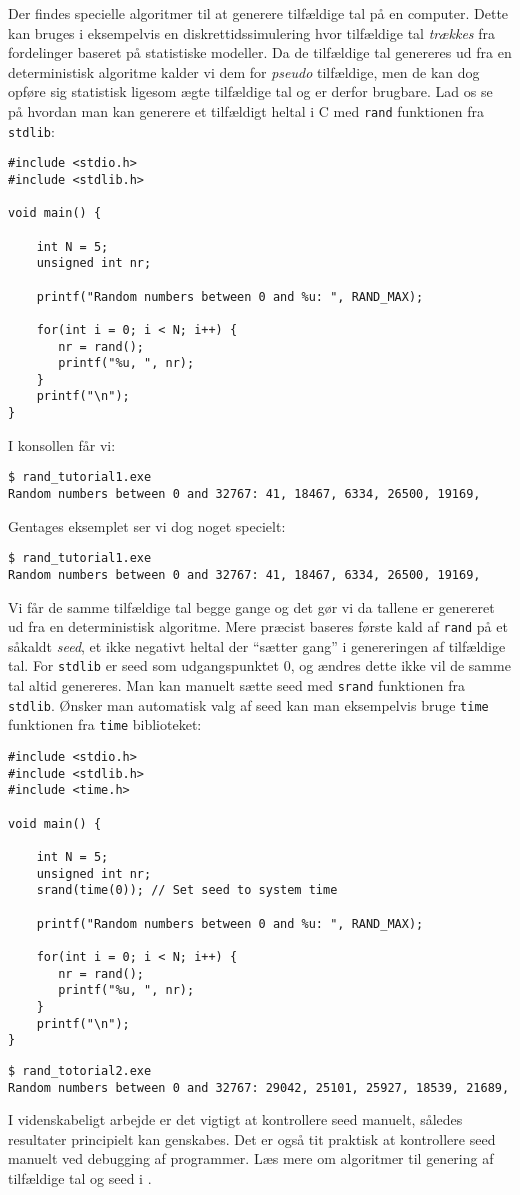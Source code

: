 Der findes specielle algoritmer til at generere tilfældige tal på en computer. Dette kan bruges i eksempelvis en diskrettidssimulering hvor tilfældige tal \emph{trækkes} fra fordelinger baseret på statistiske modeller. Da de tilfældige tal genereres ud fra en deterministisk algoritme kalder vi dem for \emph{pseudo} tilfældige, men de kan dog opføre sig statistisk ligesom ægte tilfældige tal og er derfor brugbare. Lad os se på hvordan man kan generere et tilfældigt heltal i C med \texttt{rand} funktionen fra \texttt{stdlib}: 
\begin{lstlisting} 
#include <stdio.h>
#include <stdlib.h>

void main() {
    
    int N = 5; 
    unsigned int nr; 
    
    printf("Random numbers between 0 and %u: ", RAND_MAX); 
    
    for(int i = 0; i < N; i++) {
       nr = rand(); 
       printf("%u, ", nr);  
    }
    printf("\n"); 
}
\end{lstlisting}
\lstset{style=console,breaklines=true}
I konsollen får vi: 
\begin{lstlisting} 
$ rand_tutorial1.exe
Random numbers between 0 and 32767: 41, 18467, 6334, 26500, 19169,
\end{lstlisting}
Gentages eksemplet ser vi dog noget specielt: 
\begin{lstlisting} 
$ rand_tutorial1.exe
Random numbers between 0 and 32767: 41, 18467, 6334, 26500, 19169,
\end{lstlisting}
Vi får de samme tilfældige tal begge gange og det gør vi da tallene er genereret ud fra en deterministisk algoritme. Mere præcist baseres første kald af \texttt{rand} på et såkaldt \emph{seed}, et ikke negativt heltal der ``sætter gang'' i genereringen af tilfældige tal. For \texttt{stdlib} er seed som udgangspunktet $0$, og ændres dette ikke vil de samme tal altid genereres. Man kan manuelt sætte seed med \texttt{srand} funktionen fra \texttt{stdlib}. Ønsker man automatisk valg af seed kan man eksempelvis bruge \texttt{time} funktionen fra \texttt{time} biblioteket: 
\lstset{style = mystyle}
\begin{lstlisting} 
#include <stdio.h>
#include <stdlib.h>
#include <time.h>

void main() {
    
    int N = 5; 
    unsigned int nr;
    srand(time(0)); // Set seed to system time
     
    printf("Random numbers between 0 and %u: ", RAND_MAX); 
    
    for(int i = 0; i < N; i++) {
       nr = rand(); 
       printf("%u, ", nr);  
    }
    printf("\n"); 
}
\end{lstlisting}
\lstset{style = console}
\begin{lstlisting}
$ rand_totorial2.exe
Random numbers between 0 and 32767: 29042, 25101, 25927, 18539, 21689,
\end{lstlisting}
I videnskabeligt arbejde er det vigtigt at kontrollere seed manuelt, således resultater principielt kan genskabes. Det er også tit praktisk at kontrollere seed manuelt ved debugging af programmer. Læs mere om algoritmer til genering af tilfældige tal og seed i \cite[282-283]{olofsson2012}. 